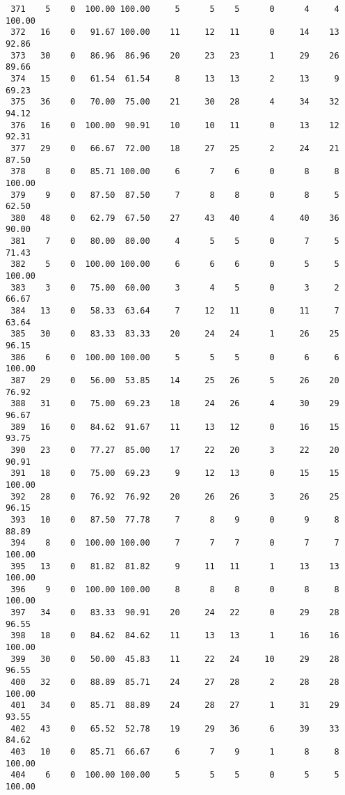 \begin{verbatim}
 371    5    0  100.00 100.00     5      5    5      0      4     4   100.00
 372   16    0   91.67 100.00    11     12   11      0     14    13    92.86
 373   30    0   86.96  86.96    20     23   23      1     29    26    89.66
 374   15    0   61.54  61.54     8     13   13      2     13     9    69.23
 375   36    0   70.00  75.00    21     30   28      4     34    32    94.12
 376   16    0  100.00  90.91    10     10   11      0     13    12    92.31
 377   29    0   66.67  72.00    18     27   25      2     24    21    87.50
 378    8    0   85.71 100.00     6      7    6      0      8     8   100.00
 379    9    0   87.50  87.50     7      8    8      0      8     5    62.50
 380   48    0   62.79  67.50    27     43   40      4     40    36    90.00
 381    7    0   80.00  80.00     4      5    5      0      7     5    71.43
 382    5    0  100.00 100.00     6      6    6      0      5     5   100.00
 383    3    0   75.00  60.00     3      4    5      0      3     2    66.67
 384   13    0   58.33  63.64     7     12   11      0     11     7    63.64
 385   30    0   83.33  83.33    20     24   24      1     26    25    96.15
 386    6    0  100.00 100.00     5      5    5      0      6     6   100.00
 387   29    0   56.00  53.85    14     25   26      5     26    20    76.92
 388   31    0   75.00  69.23    18     24   26      4     30    29    96.67
 389   16    0   84.62  91.67    11     13   12      0     16    15    93.75
 390   23    0   77.27  85.00    17     22   20      3     22    20    90.91
 391   18    0   75.00  69.23     9     12   13      0     15    15   100.00
 392   28    0   76.92  76.92    20     26   26      3     26    25    96.15
 393   10    0   87.50  77.78     7      8    9      0      9     8    88.89
 394    8    0  100.00 100.00     7      7    7      0      7     7   100.00
 395   13    0   81.82  81.82     9     11   11      1     13    13   100.00
 396    9    0  100.00 100.00     8      8    8      0      8     8   100.00
 397   34    0   83.33  90.91    20     24   22      0     29    28    96.55
 398   18    0   84.62  84.62    11     13   13      1     16    16   100.00
 399   30    0   50.00  45.83    11     22   24     10     29    28    96.55
 400   32    0   88.89  85.71    24     27   28      2     28    28   100.00
 401   34    0   85.71  88.89    24     28   27      1     31    29    93.55
 402   43    0   65.52  52.78    19     29   36      6     39    33    84.62
 403   10    0   85.71  66.67     6      7    9      1      8     8   100.00
 404    6    0  100.00 100.00     5      5    5      0      5     5   100.00

\end{verbatim}

